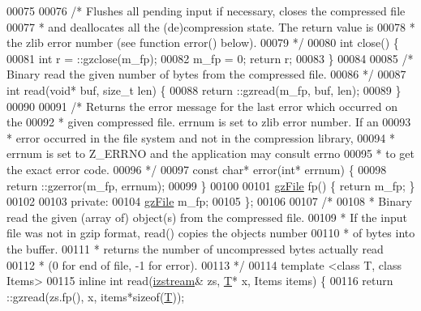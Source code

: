 \begin{DoxyCode}
00075 
00076         \textcolor{comment}{/* Flushes all pending input if necessary, closes the compressed file}
00077 \textcolor{comment}{         * and deallocates all the (de)compression state. The return value is}
00078 \textcolor{comment}{         * the zlib error number (see function error() below).}
00079 \textcolor{comment}{         */}
00080         \textcolor{keywordtype}{int} close() \{
00081             \textcolor{keywordtype}{int} r = ::gzclose(m\_fp);
00082             m\_fp = 0; \textcolor{keywordflow}{return} r;
00083         \}
00084 
00085         \textcolor{comment}{/* Binary read the given number of bytes from the compressed file.}
00086 \textcolor{comment}{         */}
00087         \textcolor{keywordtype}{int} read(\textcolor{keywordtype}{void}* buf, \textcolor{keywordtype}{size\_t} len) \{
00088             return ::gzread(m\_fp, buf, len);
00089         \}
00090 
00091         \textcolor{comment}{/* Returns the error message for the last error which occurred on the}
00092 \textcolor{comment}{         * given compressed file. errnum is set to zlib error number. If an}
00093 \textcolor{comment}{         * error occurred in the file system and not in the compression library,}
00094 \textcolor{comment}{         * errnum is set to Z\_ERRNO and the application may consult errno}
00095 \textcolor{comment}{         * to get the exact error code.}
00096 \textcolor{comment}{         */}
00097         \textcolor{keyword}{const} \textcolor{keywordtype}{char}* error(\textcolor{keywordtype}{int}* errnum) \{
00098             return ::gzerror(m\_fp, errnum);
00099         \}
00100 
00101         \hyperlink{structgz_file__s}{gzFile} fp() \{ \textcolor{keywordflow}{return} m\_fp; \}
00102 
00103     \textcolor{keyword}{private}:
00104         \hyperlink{structgz_file__s}{gzFile} m\_fp;
00105 \};
00106 
00107 \textcolor{comment}{/*}
00108 \textcolor{comment}{ * Binary read the given (array of) object(s) from the compressed file.}
00109 \textcolor{comment}{ * If the input file was not in gzip format, read() copies the objects number}
00110 \textcolor{comment}{ * of bytes into the buffer.}
00111 \textcolor{comment}{ * returns the number of uncompressed bytes actually read}
00112 \textcolor{comment}{ * (0 for end of file, -1 for error).}
00113 \textcolor{comment}{ */}
00114 \textcolor{keyword}{template} <\textcolor{keyword}{class} T, \textcolor{keyword}{class} Items>
00115 \textcolor{keyword}{inline} \textcolor{keywordtype}{int} read(\hyperlink{classizstream}{izstream}& zs, \hyperlink{group___sparse_core___module}{T}* x, Items items) \{
00116     return ::gzread(zs.fp(), x, items*\textcolor{keyword}{sizeof}(\hyperlink{group___sparse_core___module}{T}));

\end{DoxyCode}
